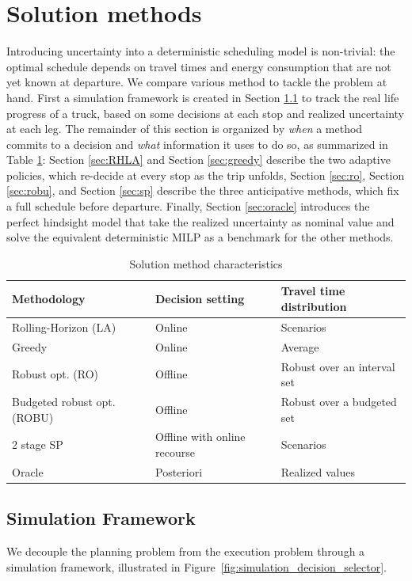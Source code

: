 \documentclass[preprint,12pt,3p]{elsarticle}
\begin{document}
\section{Solution methods} \label{sec:method}
Introducing uncertainty into a deterministic scheduling model is non-trivial: the optimal schedule depends on travel times and energy consumption that are not yet known at departure. We compare various method to tackle the problem at hand. First a simulation framework is created in Section \ref{sec:simulation} to track the real life progress of a truck, based on some decisions at each stop and realized uncertainty at each leg.
The remainder of this section is organized by \textit{when} a method commits to a decision and \textit{what} information it uses to do so, as summarized in Table \ref{tab:methodologies}: Section \ref{sec:RHLA} and Section \ref{sec:greedy} describe the two adaptive policies, which re-decide at every stop as the trip unfolds, Section \ref{sec:ro}, {Section \ref{sec:robu},} and Section \ref{sec:sp} describe the {three} anticipative methods, which fix a full schedule before departure. Finally, Section \ref{sec:oracle} introduces the perfect hindsight model that take the realized uncertainty as nominal value and solve the equivalent deterministic MILP as a benchmark for the other methods.


\begin{table} [h!]
    \centering
    \begin{tabular}{lll}\toprule
         Methodology&  Decision setting& Travel time distribution\\\midrule
         Rolling-Horizon (LA) &  Online & Scenarios\\
         Greedy&  Online & Average\\
         Robust opt. (RO)&  Offline & Robust over an interval set\\
         Budgeted robust opt. (ROBU)& Offline & Robust over a budgeted set\\
         2 stage SP&  Offline with online recourse & Scenarios\\
         Oracle&  Posteriori& Realized values\\ \bottomrule
    \end{tabular}
    \caption{Solution method characteristics}
    \label{tab:methodologies}
\end{table}

\subsection{Simulation Framework} \label{sec:simulation}
We decouple the planning problem from the execution problem through a simulation framework, illustrated in Figure~\ref{fig:simulation_decision_selector}.
\end{document}

